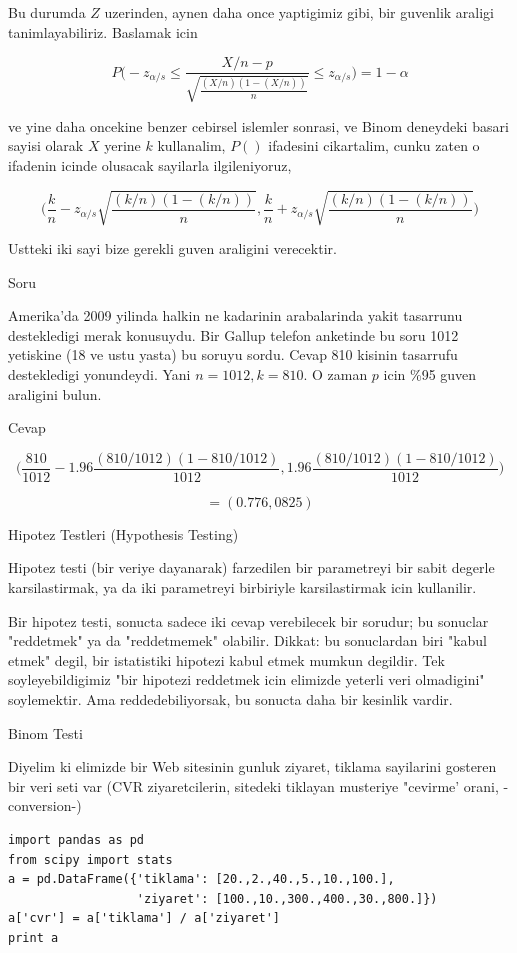 \documentclass[12pt,fleqn]{article}\usepackage{../common}
\begin{document}
Bu durumda $Z$ uzerinden, aynen daha once yaptigimiz gibi, bir guvenlik
araligi tanimlayabiliriz. Baslamak icin 

$$ 
P \bigg( 
-z_{\alpha/s} \le
\frac{X/n - p}{\sqrt{\frac{(X/n)(1-(X/n))}{n}}} \le 
z_{\alpha/s}
\bigg) =
1-\alpha
$$

ve yine daha oncekine benzer cebirsel islemler sonrasi, ve Binom deneydeki
basari sayisi olarak $X$ yerine $k$ kullanalim, $P()$ ifadesini cikartalim,
cunku zaten o ifadenin icinde olusacak sayilarla ilgileniyoruz,

$$ 
\bigg( 
\frac{k}{n}-
z_{\alpha/s}\sqrt{\frac{(k/n)(1-(k/n))}{n}}
,
\frac{k}{n} +
z_{\alpha/s} \sqrt{\frac{(k/n)(1-(k/n))}{n}}
\bigg)
$$

Ustteki iki sayi bize gerekli guven araligini verecektir. 

Soru 

Amerika'da 2009 yilinda halkin ne kadarinin arabalarinda yakit tasarrunu
destekledigi merak konusuydu. Bir Gallup telefon anketinde bu soru 1012
yetiskine (18 ve ustu yasta) bu soruyu sordu. Cevap 810 kisinin tasarrufu
destekledigi yonundeydi. Yani $n=1012,k=810$. O zaman $p$ icin \%95 guven
araligini bulun.

Cevap 

$$ \bigg(
\frac{810}{1012}-1.96 \frac{(810/1012)(1-810/1012)}{1012} ,
1.96 \frac{(810/1012)(1-810/1012)}{1012}
\bigg)
$$

$$ = (0.776,0825) $$

Hipotez Testleri (Hypothesis Testing)

Hipotez testi (bir veriye dayanarak) farzedilen bir parametreyi bir
sabit degerle karsilastirmak, ya da iki parametreyi birbiriyle
karsilastirmak icin kullanilir. 

Bir hipotez testi, sonucta sadece iki cevap verebilecek bir sorudur;
bu sonuclar "reddetmek" ya da "reddetmemek" olabilir. Dikkat: bu
sonuclardan biri "kabul etmek" degil, bir istatistiki hipotezi kabul
etmek mumkun degildir. Tek soyleyebildigimiz "bir hipotezi reddetmek
icin elimizde yeterli veri olmadigini" soylemektir. Ama
reddedebiliyorsak, bu sonucta daha bir kesinlik vardir. 

Binom Testi

Diyelim ki elimizde bir Web sitesinin gunluk ziyaret, tiklama sayilarini
gosteren bir veri seti var (CVR ziyaretcilerin, sitedeki tiklayan musteriye
"cevirme' orani, -conversion-)

\begin{verbatim}
import pandas as pd
from scipy import stats
a = pd.DataFrame({'tiklama': [20.,2.,40.,5.,10.,100.],
                  'ziyaret': [100.,10.,300.,400.,30.,800.]})
a['cvr'] = a['tiklama'] / a['ziyaret'] 
print a
\end{verbatim}
\end{document}
